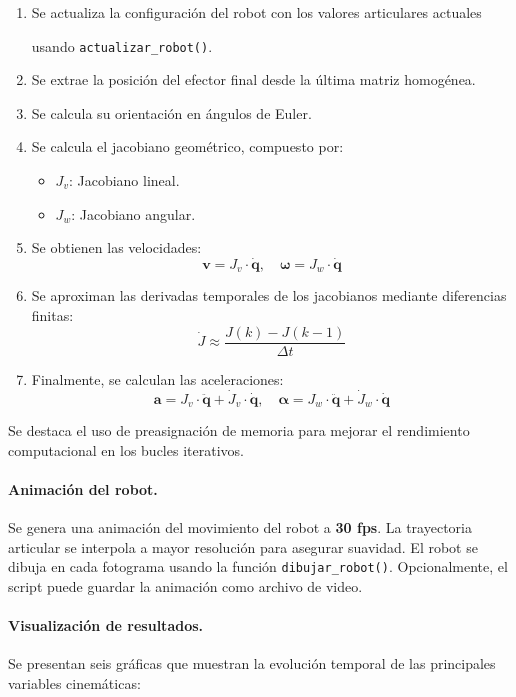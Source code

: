 \begin{enumerate}
	\item Se actualiza la configuración del robot con los valores articulares actuales
	
	usando \texttt{actualizar\_robot()}.
	\item Se extrae la posición del efector final desde la última matriz homogénea.
	\item Se calcula su orientación en ángulos de Euler.
	\item Se calcula el jacobiano geométrico, compuesto por:
	\begin{itemize}
		\item $J_v$: Jacobiano lineal.
		\item $J_w$: Jacobiano angular.
	\end{itemize}
	\item Se obtienen las velocidades:
	\[
	\mathbf{v} = J_v \cdot \dot{\mathbf{q}}, \quad
	\boldsymbol{\omega} = J_w \cdot \dot{\mathbf{q}}
	\]
	\item Se aproximan las derivadas temporales de los jacobianos mediante diferencias finitas:
	\[
	\dot{J} \approx \frac{J(k) - J(k-1)}{\Delta t}
	\]
	\item Finalmente, se calculan las aceleraciones:
	\[
	\mathbf{a} = J_v \cdot \ddot{\mathbf{q}} + \dot{J}_v \cdot \dot{\mathbf{q}}, \quad
	\boldsymbol{\alpha} = J_w \cdot \ddot{\mathbf{q}} + \dot{J}_w \cdot \dot{\mathbf{q}}
	\]
\end{enumerate}

Se destaca el uso de preasignación de memoria para mejorar el rendimiento computacional en los bucles iterativos.

\paragraph{Animación del robot.}

Se genera una animación del movimiento del robot a \textbf{30 fps}. La trayectoria articular se interpola a mayor resolución para asegurar suavidad. El robot se dibuja en cada fotograma usando la función \texttt{dibujar\_robot()}. Opcionalmente, el script puede guardar la animación como archivo de video.

\paragraph{Visualización de resultados.}

Se presentan seis gráficas que muestran la evolución temporal de las principales variables cinemáticas:

